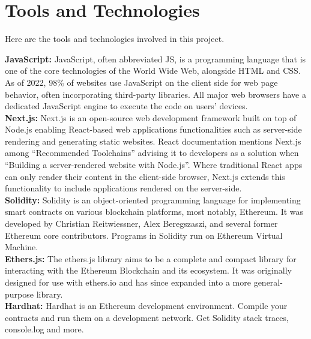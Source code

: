
\section{Tools and Technologies}

Here are the tools and technologies involved in this project.

\noindent
\textbf{JavaScript: } JavaScript, often abbreviated JS, is a programming language that is one of the core technologies of the World Wide Web, alongside HTML and CSS. As of 2022, 98\% of websites use JavaScript on the client side for web page behavior, often incorporating third-party libraries. All major web browsers have a dedicated JavaScript engine to execute the code on users' devices. \\[-8pt]

\noindent
\textbf{Next.js: } Next.js is an open-source web development framework built on top of Node.js enabling React-based web applications functionalities such as server-side rendering and generating static websites. React documentation mentions Next.js among ``Recommended Toolchains'' advising it to developers as a solution when ``Building a server-rendered website with Node.js''. Where traditional React apps can only render their content in the client-side browser, Next.js extends this functionality to include applications rendered on the server-side. \\[-8pt]

\noindent
\textbf{Solidity: } Solidity is an object-oriented programming language for implementing smart contracts on various blockchain platforms, most notably, Ethereum. It was developed by Christian Reitwiessner, Alex Beregszaszi, and several former Ethereum core contributors. Programs in Solidity run on Ethereum Virtual Machine. \\[-8pt]

\noindent
\textbf{Ethers.js: } The ethers.js library aims to be a complete and compact library for interacting with the Ethereum Blockchain and its ecosystem. It was originally designed for use with ethers.io and has since expanded into a more general-purpose library. \\[-8pt]

\noindent
\textbf{Hardhat: } Hardhat is an Ethereum development environment. Compile your contracts and run them on a development network. Get Solidity stack traces, console.log and more. \\[-8pt]

